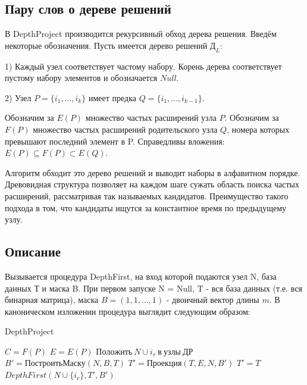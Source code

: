 \documentclass[a4paper, 12pt, oneside]{scrartcl}
\begin{document}
\subsection{Пару слов о дереве решений}

В DepthProject производится рекурсивный обход дерева решения. Введём некоторые обозначения. Пусть имеется дерево решений $Д_L$:

1) Каждый узел соответствует частому набору. Корень дерева соответствует пустому набору элементов и обозначается $Null$.

2) Узел $P = \{i_1, ..., i_k\}$ имеет предка $Q = \{i_1, ..., i_{k-1}\}$.

Обозначим за $E(P)$ множество частых расширений узла $P$. Обозначим за $F(P)$ множество частых расширений родительского узла $Q$, номера которых превышают последний элемент в P. Справедливы вложения: $E(P) \subseteq F(P) \subset E(Q)$.

Алгоритм обходит это дерево решений и выводит наборы в алфавитном порядке. Древовидная структура позволяет на каждом шаге сужать область поиска частых расширений, рассматривая так называемых кандидатов. Преимущество такого подхода в том, что кандидаты ищутся за константное время по предыдущему узлу.

\subsection{Описание}

Вызывается процедура DepthFirst, на вход которой подаются узел N, база данных Т и маска B. При первом запуске N = Null, T - вся база данных (т.е. вся бинарная матрица), маска $B = (1, 1, ..., 1)$ - двоичный вектор длины $m$. В каноническом изложении процедура выглядит следующим образом:

\begin{algorithm}
\caption{DepthProject}\label{alg:Examples}
\begin{algorithmic}[1]
	\State $C = F(P)$
	\State $E = E(P)$
	\State $Положить\ N \cup i_r\ в\ узлы\ ДР$
	\State $B' = ПостроитьМаску(N, B, T)$
	    \State $T' = Проекция(T, E, N, B')$
	\Else
	    \State $T' = T$
	\EndIf
		\State $DepthFirst(N \cup \{i_r\}, T', B')$
	\EndFor
\EndProcedure
\end{algorithmic}
\end{algorithm}
\end{document}
